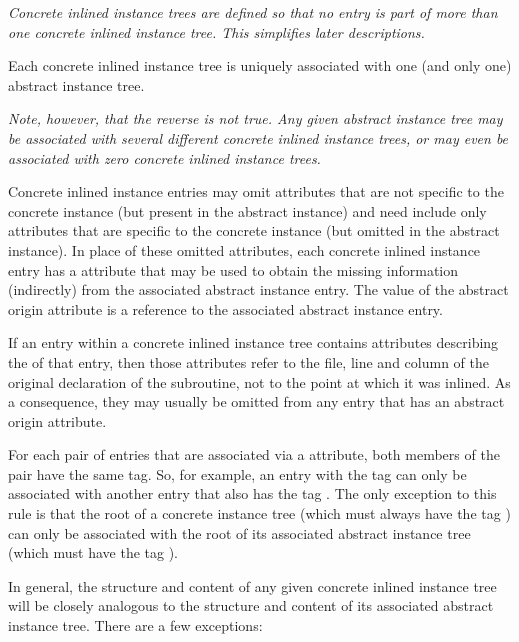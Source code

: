 \textit{Concrete inlined instance trees are defined so that no entry
is part of more than one concrete inlined instance tree. This
simplifies later descriptions.}

Each concrete inlined instance tree is uniquely associated
with one (and only one) abstract instance tree.

\textit{Note, however, that the reverse is not true. Any given abstract
instance tree may be associated with several different concrete
inlined instance trees, or may even be associated with zero
concrete inlined instance trees.}

Concrete inlined instance entries may omit attributes that
are not specific to the concrete instance (but present in
the abstract instance) and need include only attributes that
are specific to the concrete instance (but omitted in the
abstract instance). In place of these omitted attributes, 
each\hypertarget{chap:DWATabstractorigininlineinstance}{}
concrete inlined instance entry has a
\DWATabstractoriginDEFN{}
attribute that may be used to obtain the missing information
(indirectly) from the associated abstract instance entry. The
value of the abstract origin attribute is a reference to the
associated abstract instance entry.

If an entry within a concrete inlined instance tree contains
attributes describing the 
of that entry, then those attributes refer to the file, line
and column of the original declaration of the subroutine,
not to the point at which it was inlined. As a consequence,
they may usually be omitted from any entry that has an abstract
origin attribute.

For each pair of entries that are associated via a
\DWATabstractorigin{} attribute, both members of the pair
have the same tag. So, for example, an entry with the tag
\DWTAGvariable{} can only be associated with another entry
that also has the tag \DWTAGvariable. The only exception
to this rule is that the root of a concrete instance tree
(which must always have the tag \DWTAGinlinedsubroutine)
can only be associated with the root of its associated abstract
instance tree (which must have the tag \DWTAGsubprogram).

In general, the structure and content of any given concrete
inlined instance tree will be closely analogous to the
structure and content of its associated abstract instance
tree. There are a few exceptions:

